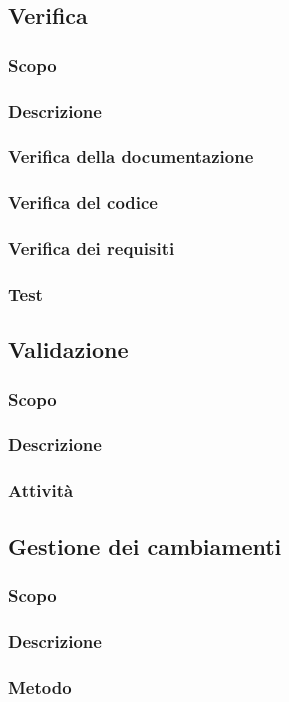 \subsection{Verifica}
\subsubsection{Scopo}
\subsubsection{Descrizione}
\subsubsection{Verifica della documentazione}
\subsubsection{Verifica del codice}
\subsubsection{Verifica dei requisiti}
\subsubsection{Test}

\subsection{Validazione}
\subsubsection{Scopo}
\subsubsection{Descrizione}
\subsubsection{Attività}

\subsection{Gestione dei cambiamenti}
\subsubsection{Scopo}
\subsubsection{Descrizione}
\subsubsection{Metodo}
